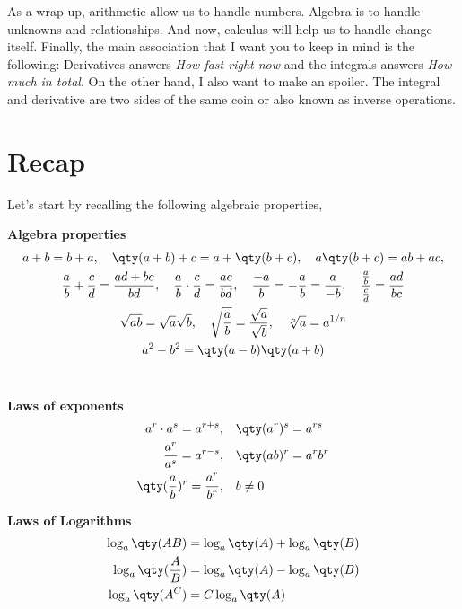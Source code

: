 \documentclass[../main-notes.tex]{subfile}
\begin{document}
As a wrap up, arithmetic allow us to handle numbers.
Algebra is to handle unknowns and relationships.
And now, calculus will help us to handle change itself.
Finally, the main association that I want you to keep in mind is the following:
Derivatives answers \emph{How fast right now} and the integrals answers \textit{How much in total}.
On the other hand, I also want to make an spoiler.
The integral and derivative are two sides of the same coin or also known as inverse operations.

\newpage


\section{Recap}

Let's start by recalling the following algebraic properties,

\vspace{1em}

\begin{minipage}[c]{\textwidth}
    \centering
    {\bfseries\large Algebra properties}
    \begin{gather*}
        a+b = b+a, \quad
        \qty(a+b)+c = a+\qty(b+c), \quad
        a\qty(b+c) = ab+ac, \\
        \frac{a}{b} + \frac{c}{d} = \frac{ad+bc}{bd}, \quad
        \frac{a}{b} \cdot \frac{c}{d} = \frac{ac}{bd}, \quad
        \frac{-a}{b} = -\frac{a}{b} = \frac{a}{-b}, \quad
        \frac{\frac{a}{b}}{\frac{c}{d}} = \frac{ad}{bc}
        \\
        \sqrt{ab} = \sqrt{a}\sqrt{b},\quad
        \sqrt{\frac{a}{b}} = \frac{\sqrt{a}}{\sqrt{b}},\quad
        \sqrt[n]{a} = a^{1/n}
        \\
        a^2-b^2 = \qty(a-b)\qty(a+b)
        \end{gather*}
        \\

        \begin{minipage}[c]{0.45\textwidth}
    \centering
    {\bfseries\large Laws of exponents}
    \begin{align*}
        a^r\cdot a^s = a^{r+s}, \quad & \qty(a^r)^s = a^{rs} \\
        \frac{a^r}{a^s} = a^{r-s}, \quad & \qty(ab)^r = a^r b^r \\
        \qty(\frac{a}{b})^r = \frac{a^r}{b^r},\quad & b\neq 0
    \end{align*}
\end{minipage}
\begin{minipage}[c]{0.45\textwidth}
    \centering
    {\bfseries\large Laws of Logarithms}
    \begin{align*}
        \log_a\qty(AB) &= \log_a\qty(A) + \log_a\qty(B) \\
        \log_a\qty(\frac{A}{B}) &= \log_a\qty(A) - \log_a\qty(B) \\
        \log_a\qty(A^C) &= C\log_a\qty(A)
    \end{align*}
\end{minipage}

    
\end{minipage}
\end{document}
